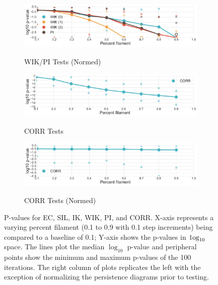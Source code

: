 \documentclass[12pt]{article}
\begin{document}
\begin{description}
\begin{center}
\begin{figure}[htp!]
\begin{subfigure}{.45\textwidth}
        \label{fig:all_weight}
      \end{subfigure}
      \begin{subfigure}{.45\textwidth}
        \centering
        \caption{WIK/PI Tests (Normed)}
        \includegraphics[width=\linewidth]{figure_8_all_weighted_contour_group_normed.pdf}
        \label{fig:all_weight_normed}
      \end{subfigure}
      \begin{subfigure}{.45\textwidth}
        \caption{CORR Tests}
        \includegraphics[width=\linewidth]{figure_8_all_correlation_group.pdf}
        \label{fig:all_corr}
      \end{subfigure}
      \begin{subfigure}{.45\textwidth}
        \caption{CORR Tests (Normed)}
        \includegraphics[width=\linewidth]{figure_8_all_correlation_group_normed.pdf}
        \label{fig:all_corr_normed}
      \end{subfigure}
      \caption{P-values for EC, SIL, IK, WIK, PI, and CORR. X-axis represents a varying percent filament (0.1 to 0.9 with 0.1 step increments) being compared to a baseline of 0.1; Y-axis shows the p-values in $\textup{1og}_{10}$ space. The lines plot the median $\log_{10}$ p-value and peripheral points show the minimum and maximum p-values of the 100 iterations. The right column of plots replicates the left with the exception of normalizing the persistence diagrams prior to testing.}
      \label{fig:linesUnnormApp}
    \end{figure}
  \end{center}
\end{description}




\end{document}
